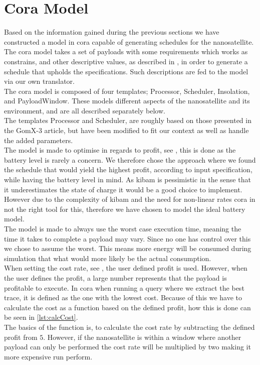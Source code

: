 \section{Cora Model} \label{sec:cora}
Based on the information gained during the previous sections we have constructed a model in \gls{cora} capable of generating schedules for the nanosatellite. The \gls{cora} model takes a set of payloads with some requirements which works as constrains, and other descriptive values, as described in , in order to generate a schedule that upholds the specifications. Such descriptions are fed to the model via our own translator.\\
The \gls{cora} model is composed of four templates; Processor, Scheduler, Insolation, and PayloadWindow. These models different aspects of the nanosatellite and its environment, and are all described separately below.\\
The templates Processor and Scheduler, are roughly based on those presented in the GomX-3 article\cite{gomx3}, but have been modified to fit our context as well as handle the added parameters.\\
The model is made to optimise in regards to profit, see , this is done as the battery level is rarely a concern\cite{gom_space_conversation}. We therefore chose the approach where we found the schedule that would yield the highest profit, according to input specification, while having the battery level in mind. As \gls{kibam} is pessimistic in the sense that it underestimates the state of charge it would be a good choice to implement. However due to the complexity of \gls{kibam} and the need for non-linear rates \gls{cora} in not the right tool for this, therefore we have chosen to model the ideal battery model.\\
The model is made to always use the worst case execution time, meaning the time it takes to complete a payload may vary. Since no one has control over this we chose to assume the worst. This means more energy will be consumed during simulation that what would more likely be the actual consumption.\\
When setting the cost rate, see , the user defined profit is used. However, when the user defines the profit, a large number represents that the payload is profitable to execute. In \gls{cora} when running a query where we extract the best trace, it is defined as the one with the lowest cost. Because of this we have to calculate the cost as a function based on the defined profit, how this is done can be seen in \cref{lst:calcCost}.\\
The basics of the function  is, to calculate the cost rate by subtracting the defined profit from $5$. However, if the nanosatellite is within a window where another payload can only be performed the cost rate will be multiplied by two making it more expensive run perform.\\


